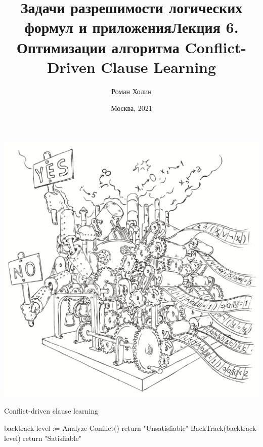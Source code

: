 \documentclass{beamer}
\begin{document}
\title{Задачи разрешимости логических формул и приложения\newline Лекция 6. Оптимизации алгоритма Conflict-Driven Clause Learning}
\author{Роман Холин}
\date{Москва, 2021}

\begin{frame}
\includegraphics[scale=0.5]{../decision-procedure.png}
\end{frame}

\frame{\titlepage}

\begin{frame}{Conflict-driven clause learning}
\begin{algorithmic}
            \State backtrack-level := Analyze-Conflict()
                \State return "Unsatisfiable"
            \EndIf
            \State BackTrack(backtrack-level)
                \State return "Satisfiable"
            \EndIf
        \EndWhile
    \EndWhile
\EndFunction
\end{algorithmic}
\end{frame}
\end{document}
